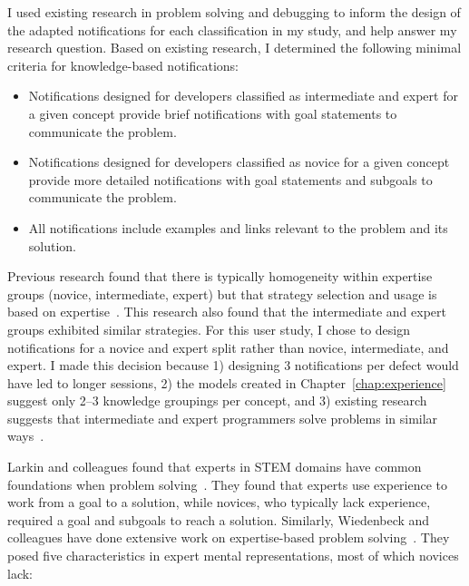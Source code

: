 I used existing research in problem solving and debugging to inform the design of the adapted notifications for each classification in my study, and help answer my research question.
Based on existing research, I determined the following minimal criteria for knowledge-based notifications:
\begin{itemize}
    \item Notifications designed for developers classified as intermediate and expert for a given concept provide brief notifications with goal statements to communicate the problem.
    \item Notifications designed for developers classified as novice for a given concept provide more detailed notifications with goal statements and subgoals to communicate the problem.
    \item All notifications include examples and links relevant to the problem and its solution.
\end{itemize}

Previous research found that there is typically homogeneity within expertise groups (novice, intermediate, expert) but that strategy selection and usage is based on expertise~\cite{mckeithen1981knowledge}. This research also found that the intermediate and expert groups exhibited similar strategies.
For this user study, I chose to design notifications for a novice and expert split rather than novice, intermediate, and expert. I made this decision because 1) designing 3 notifications per defect would have led to longer sessions, 2) the models created in Chapter~\ref{chap:experience} suggest only 2--3 knowledge groupings per concept, and 3) existing research suggests that intermediate and expert programmers solve problems in similar ways~\cite{mckeithen1981knowledge}.



Larkin and colleagues found that experts in STEM domains have common foundations when problem solving~\cite{larkin1980expert}. They found that experts use experience to work from a goal to a solution, while novices, who typically lack experience, required a goal and subgoals to reach a solution. Similarly, Wiedenbeck and colleagues have done extensive work on expertise-based problem solving~\cite{wiedenbeck1985novice,Wiedenbeck:1993:Mental}. They posed five characteristics in expert mental representations, most of which novices lack:


